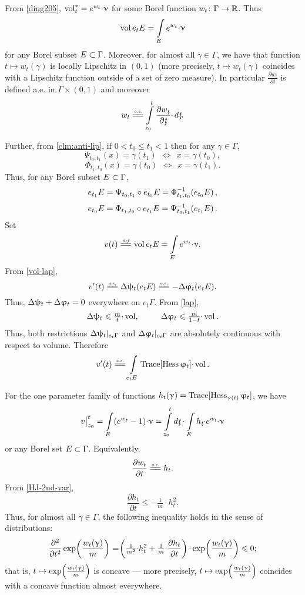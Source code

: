 \documentclass[oneside,a4paper]{article}
\begin{document}
{\sloppy
{}
From \ref{ding205}, $\mathop{\rm vol}\nolimits_t^*=e^{w_t}{\cdot}\upnu$ for some Borel function $w_t\colon\Gamma\to\mathbb{R}$.
Thus
$$\mathop{\rm vol}\nolimits e_t E=\int\limits_{E}e^{w_t}{\cdot}\upnu$$ 
for any Borel subset $E\subset \Gamma$.
Moreover, for almost all $\gamma\in\Gamma$, we have that function $t\mapsto w_t(\gamma)$ is locally Lipschitz in $(0,1)$ (more precisely, $t\mapsto w_t(\gamma)$ coincides with a Lipschitz function outside of a set of zero measure).
In particular $\frac{\partial w_t}{\partial t}$ is defined a.e. in $\Gamma\times (0,1)$
and moreover 
$$w_t
\ae
\int\limits_{z_0}^{t}\frac{\partial w_\under{t}}{\partial \under{t}}{\cdot}\,d\under{t}.$$

}\medskip

Further, from \ref{clm:anti-lip}, if $0<t_0\le t_1<1$ then for any $\gamma\in\Gamma$,
$$\Psi_{t_0,t_1}(x)= \gamma(t_1)\ \ \Longleftrightarrow\ \ x=\gamma({t_0}),$$
$$\Phi_{t_1,t_0}(x)= \gamma({t_0})\ \ \Longleftrightarrow\ \ x=\gamma({t_1}).$$
Thus, for any Borel subset $E\subset \Gamma$,
$$e_{t_1}E=\Psi_{t_0,t_1}\circ e_{t_0}E=\Phi^{-1}_{t_1,t_0}\!\left( e_{t_0}E\right),$$
$$e_{t_0}E=\Phi_{t_1,t_0}\circ  e_{t_1}E=\Psi^{-1}_{t_0,t_1}\!\left(  e_{t_1}E\right).$$
Set 
$$v(t)
\df
\vol e_t E
=
\int\limits_{E}e^{w_t}{\cdot}\nu.$$ 
From \ref{vol-lap},
$$v'(t)
\ae
\Lap\psi_t(e_t E)
\ae
-\Lap\phi_t(e_t E).$$ 
Thus,
$\Delta \uppsi_t+\Delta\upvarphi_t=0$
everywhere on $e_t\Gamma$.
From \ref{lap},
$$\Lap\psi_t\le\tfrac m t{\cdot}\vol,\ \ \ \ \ \ \ \ \Lap\phi_t\le\tfrac m {1-t}{\cdot}\vol.$$
Thus, both restrictions  $\Delta \uppsi_t|_{e_t\Gamma}$ and $\Delta\upvarphi_t|_{e_t\Gamma}$
are absolutely continuous with respect to volume.
Therefore
$$v'(t)
\ae
\int\limits_{e_t E}\Trace[\Hess\phi_t]{\cdot}\vol.
$$

For the one parameter family of functions $h_t(\upgamma)=\text{\rm Trace}[\operatorname{Hess}_{\upgamma(t)}\upvarphi_t]$, we have
$$\bigl.v\bigr|_{z_0}^t
=
\int\limits_E(e^{w_t}-1){\cdot}\nu
=
\int\limits_{z_0}^t d\under{t}\cdot\int\limits_E h_\under{t}{\cdot}e^{w_\under{t}}{\cdot}\nu$$
or any Borel set $E\subset \Gamma$. 
Equivalently, 
$$\frac{\partial w_t}{\partial t}
\ae 
h_t.$$
From \ref{HJ-2nd-var}, 
$$\frac{\partial h_t}{\partial t}\le -\tfrac1m{\cdot} h_t^2.$$
Thus, for almost all $\gamma\in\Gamma$, the following inequality holds in the sense of distributions:
$$\frac{\partial^2}{\partial t^2}\exp\!\left(\frac{w_t(\upgamma)}m\right)
=
\!\left(\tfrac1{m^2}{\cdot}{h_t^2}+\tfrac1{m}{\cdot}\frac{\partial h_t}{\partial t}\right){\cdot}\exp\!\left(\frac{w_t(\upgamma)}m\right)\leqslant 0;
$$ 
that is, $t\mapsto \exp\!\left(\frac{w_t(\upgamma)}m\right)$ is concave
--- more precisely, $t\mapsto \exp\!\left(\frac{w_t(\upgamma)}m\right)$ coincides with a concave function almost everywhere.
\end{document}
